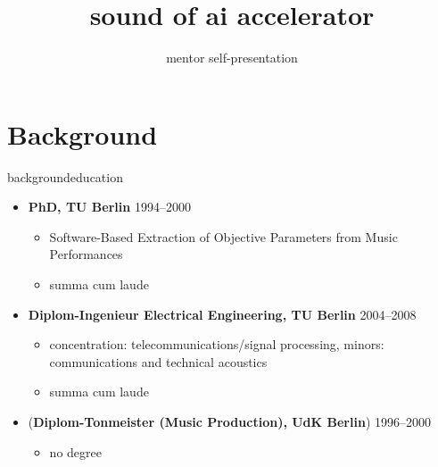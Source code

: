 

\title{sound of ai accelerator}
\subtitle{mentor self-presentation} 

	

    \section[background]{Background}
        \begin{frame}{background}{education}
            \begin{itemize}
                \item   \textbf{PhD, TU Berlin}  \hfill{1994--2000}
                    \begin{itemize}
                        \item   Software-Based Extraction of Objective Parameters from Music Performances
                        \item   summa cum laude
                    \end{itemize}
                \bigskip
                \item   \textbf{Diplom-Ingenieur Electrical Engineering, TU Berlin} \hfill 2004--2008
                    \begin{itemize}
                        \item   concentration: telecommunications/signal processing, minors: communications and technical acoustics
                        \item   summa cum laude
                    \end{itemize}
                \bigskip
                \item   (\textbf{Diplom-Tonmeister (Music Production), UdK Berlin}) \hfill 1996--2000
                    \begin{itemize}
                        \item   no degree
                    \end{itemize}
            \end{itemize}
        \end{frame}
